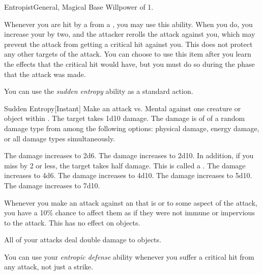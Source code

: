     \begin{feat}{Entropist}{General, Magical}
        \featpre Base Willpower of 1.

         Whenever you are hit by a  from a , you may use this ability.
        When you do, you increase your  by two, and the attacker rerolls the attack against you, which may prevent the attack from getting a critical hit against you.
        This does not protect any other targets of the attack.
        You can choose to use this item after you learn the effects that the critical hit would have, but you must do so during the phase that the attack was made.

         You can use the \textit{sudden entropy} ability as a standard action.
        \begin{instantability}{Sudden Entropy}[Instant]
            \rankline
            Make an attack vs. Mental against one creature or object within \medrange.
            \hit The target takes 1d10 \add {} damage.
            The damage is of of a random damage type from among the following options: physical damage, energy damage, or all damage types simultaneously.

            \rankline
             The damage increases to 2d6.
             The damage increases to 2d10.
                In addition, if you miss by 2 or less, the target takes half damage.
                This is called a .
             The damage increases to 4d6.
             The damage increases to 4d10.
             The damage increases to 5d10.
             The damage increases to 7d10.
        \end{instantability}

         Whenever you make an attack against an  that is  or  to some aspect of the attack, you have a 10\% chance to affect them as if they were not immune or impervious to the attack.
        This has no effect on objects.

         All of your attacks deal double damage to objects.

         You can use your \textit{entropic defense} ability whenever you suffer a critical hit from any attack, not just a strike.


\end{feat}
